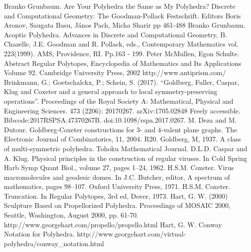 \documentclass{article}
\begin{document}
\begin{thebibliography}{1}
 Branko Grunbaum. Are Your Polyhedra the Same as My
  Polyhedra? Discrete and Computational Geometry: The Goodman-Pollack
  Festschrift. Editors Boris Aronov, Saugata Basu, János Pach, Micha Sharir
  pp 461-488
 Branko Grunbaum. Acoptic Polyhedra. Advances in Discrete
  and Computational Geometry, B. Chazelle, J.E. Goodman and R. Pollack, eds.,
  Contemporary Mathematics vol. 223(1999). AMS, Providence, RI. Pp.163 - 199.
 Peter McMullen, Egon Schulte. Abstract Regular Polytopes,
  Encyclopedia of Mathematics and Its Applications Volume 92.
  Cambridge University Press, 2002
 http://www.antiprism.com/
 Brinkmann, G.; Goetschalckx, P.; Schein, S. (2017).
  ``Goldberg, Fuller, Caspar, Klug and Coxeter and a general approach to local
  symmetry-preserving operations''. Proceedings of the Royal Society A:
  Mathematical, Physical and Engineering Sciences. 473 (2206): 20170267.
  arXiv:1705.02848 Freely accessible. Bibcode:2017RSPSA.47370267B.
  doi:10.1098/rspa.2017.0267.
 M. Deza and M. Dutour. Goldberg-Coxeter constructions for 3-
   and 4-valent plane graphs. The Electronic Journal of Combinatorics,
   11, 2004. R20.
 Goldberg, M, 1937. A class of multi-symmetric polyhedra.
    Tohoku Mathematical Journal.
 D.L.D. Caspar and A. Klug. Physical principles in the
  construction of regular viruses. In Cold Spring Harb Symp Quant Biol.,
  volume 27, pages 1–24, 1962.
 H.S.M. Coxeter. Virus macromolecules and geodesic domes.
  In J.C. Butcher, editor, A spectrum of mathematics, pages 98–107.
  Oxford University Press, 1971.
 H.S.M. Coxeter. Truncation. In Regular Polytopes, 3rd ed, Dover, 1973.
 Hart, G. W. (2000) Sculpture Based on Propellorized
  Polyhedra. Proceedings of MOSAIC 2000, Seattle, Washington, August 2000,
  pp. 61-70.  http://www.georgehart.com/propello/propello.html
 Hart, G. W. Conway Notation for Polyhedra.
  http://www.georgehart.com/virtual-polyhedra/conway\_notation.html
\end{thebibliography}
\end{document}
